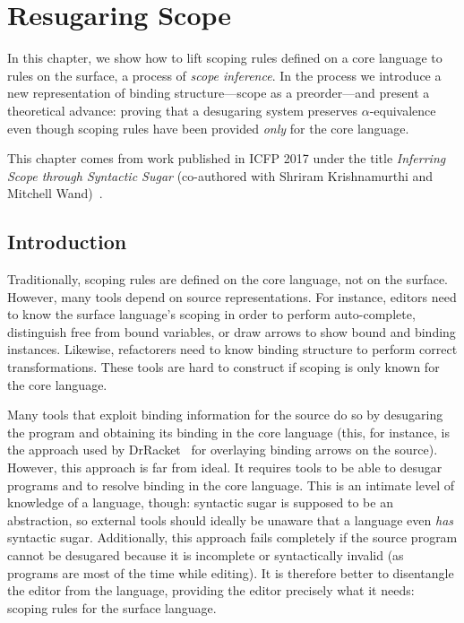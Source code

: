 \chapter{Resugaring Scope}\label{chap:resugar-scope}

In this chapter, we show how to lift scoping rules defined on a core
language to rules on the surface, a process of \emph{scope inference}.
In the process we introduce a new representation of binding
structure---scope as a preorder---and present a theoretical advance:
proving that a desugaring system preserves $\alpha$-equivalence even
though scoping rules have been provided \emph{only} for the core
language.

This chapter comes from work published in ICFP 2017 under the title
\emph{Inferring Scope through Syntactic Sugar} (co-authored with
Shriram Krishnamurthi and Mitchell Wand)~\cite{pombrio-scope}.

\section{Introduction}

Traditionally,
scoping rules are defined on the core language, not on the
surface. However, many tools depend on source representations. For
instance, editors need to know the surface language's scoping in order
to perform auto-complete, distinguish free from bound variables, or draw
arrows to show bound and binding instances. Likewise, refactorers need
to know binding structure to perform correct transformations.
These tools are hard to construct if scoping is only known
for the core language.

Many tools that exploit binding information for the source
do so by desugaring the program and obtaining its binding in the core
language (this, for instance, is the approach used by
DrRacket~\cite{drscheme} for overlaying binding arrows on the
source).
However, this approach is far from ideal. It requires tools to be able
to desugar programs and to resolve binding in the core
language. This is an intimate level of knowledge of a language, though:
syntactic sugar is supposed to be an abstraction, so external tools
should ideally be unaware that a language even \emph{has} syntactic
sugar. Additionally, this approach fails completely if the source
program cannot be desugared because it is incomplete or syntactically
invalid (as programs are most of the time while editing). It is
therefore better to disentangle the editor from the language,
providing the editor precisely what it needs: scoping rules for the
surface language.


